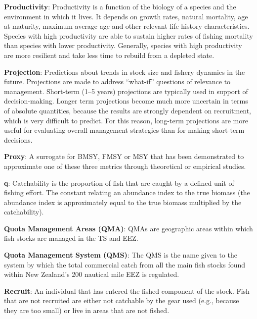 \documentclass{mpi-plenary}
\theoremstyle{definition}
\theoremstyle{definition}
\theoremstyle{definition}
\theoremstyle{remark}
\begin{document}
\protect\hypertarget{def-productivity}{}{} \textbf{Productivity}:
Productivity is a function of the biology of a species and the
environment in which it lives. It depends on growth rates, natural
mortality, age at maturity, maximum average age and other relevant life
history characteristics. Species with high productivity are able to
sustain higher rates of fishing mortality than species with lower
productivity. Generally, species with high productivity are more
resilient and take less time to rebuild from a depleted state.

\protect\hypertarget{def-projection}{}{} \textbf{Projection}:
Predictions about trends in stock size and fishery dynamics in the
future. Projections are made to address ``what-if'' questions of
relevance to management. Short-term (1--5 years) projections are
typically used in support of decision-making. Longer term projections
become much more uncertain in terms of absolute quantities, because the
results are strongly dependent on recruitment, which is very difficult
to predict. For this reason, long-term projections are more useful for
evaluating overall management strategies than for making short-term
decisions.

\protect\hypertarget{def-proxy}{}{} \textbf{Proxy}: A surrogate for
BMSY, FMSY or MSY that has been demonstrated to approximate one of these
three metrics through theoretical or empirical studies.

\protect\hypertarget{def-q}{}{} \textbf{q}: Catchability is the
proportion of fish that are caught by a defined unit of fishing effort.
The constant relating an abundance index to the true biomass (the
abundance index is approximately equal to the true biomass multiplied by
the catchability).

\protect\hypertarget{def-quota-management-areas}{}{} \textbf{Quota
Management Areas (QMA)}: QMAs are geographic areas within which fish
stocks are managed in the TS and EEZ.

\protect\hypertarget{def-quota-management-system}{}{} \textbf{Quota
Management System (QMS)}: The QMS is the name given to the system by
which the total commercial catch from all the main fish stocks found
within New Zealand's 200 nautical mile EEZ is regulated.

\protect\hypertarget{def-recruit}{}{} \textbf{Recruit}: An individual
that has entered the fished component of the stock. Fish that are not
recruited are either not catchable by the gear used (e.g., because they
are too small) or live in areas that are not fished.
\end{document}
